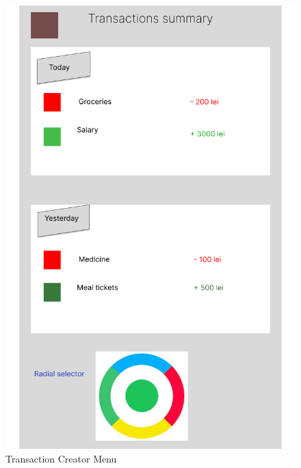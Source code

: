 \begin{figure}[htbp]
\begin{minipage}[b]{0.32\textwidth}
    \includegraphics[width=\textwidth]{Graphics/Design/TM_Menu.png }
    \caption{Transaction Creator Menu}
    \label{fig:image2}
  \end{minipage}
  \hfill
  \begin{minipage}[b]{0.32\textwidth}

\end{minipage}
\end{figure}

